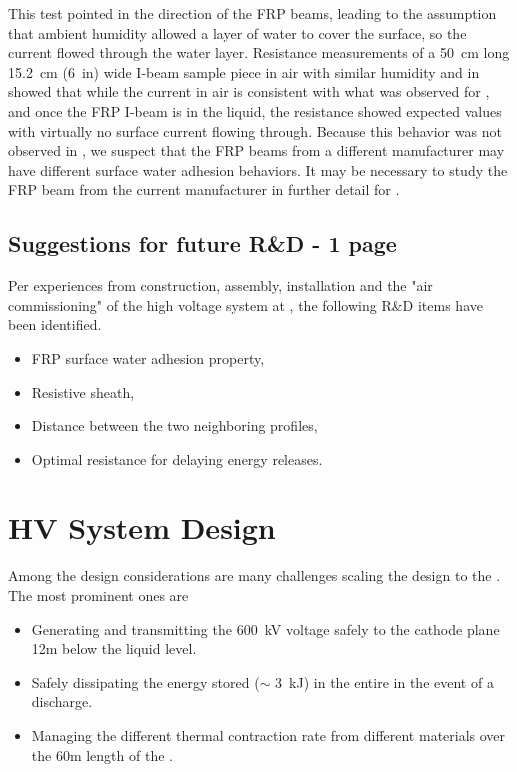 This test pointed in the direction of the FRP beams, leading to the assumption that ambient humidity allowed a layer of water to cover the surface, so the current flowed through the water layer.
Resistance measurements of a \SI{50}{\cm} long \SI{15.2}{\cm} (\SI{6}{in}) wide I-beam sample piece in air with similar humidity and in  showed that while the current in air is consistent with what was observed for  , and once the FRP I-beam is in the liquid, the resistance showed expected values with virtually no surface current flowing through.
Because this behavior was not observed in  , we suspect that the FRP beams from a different manufacturer may have different surface water adhesion behaviors. It may be necessary to study the FRP beam from the current manufacturer in further detail for \dual {}.


\subsection{Suggestions for future R\&D - 1 page}
\label{sec:fddp-hv-protodune-RD}
Per experiences from construction, assembly, installation and the "air commissioning" of the high voltage system at , the following R\&D items have been identified.

\begin{itemize}
    \item FRP surface water adhesion property,
    \item Resistive sheath,
    \item Distance between the two neighboring profiles,
    \item Optimal resistance for delaying energy releases. 
\end{itemize}
\clearpage


\section{HV System Design}
\label{sec:fddp-hv-design}


Among the design considerations are many challenges scaling the   design to the  . The most prominent ones are 
\begin{itemize}
    \item Generating and transmitting the \SI{600}{\kV} voltage safely to the cathode plane 12m below the liquid level.
    \item Safely dissipating the energy stored ($\sim$ \SI{3}{\kJ}) in the entire  in the event of a  discharge.
    \item Managing the different thermal contraction rate from different materials over the 60m length of the .
\end{itemize}

